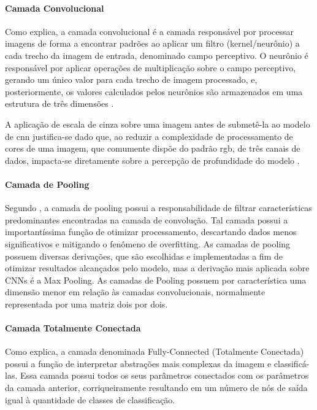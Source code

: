 \paragraph{Camada Convolucional}
Como  explica, 
a camada convolucional é a camada responsável por processar imagens de forma 
a encontrar padrões ao aplicar um filtro (kernel/neurônio) a cada trecho 
da imagem de entrada, denominado campo perceptivo. 
O neurônio é responsável por aplicar operações de multiplicação sobre o campo perceptivo, 
gerando um único valor para cada trecho de imagem processado, 
e, posteriormente, os valores calculados pelos neurônios são 
armazenados em uma estrutura de três dimensões \cite{ayeni2022convolutional}.

A aplicação de escala de cinza sobre uma imagem antes de 
submetê-la ao modelo de \gls{cnn} justifica-se dado que, 
ao reduzir a complexidade de processamento de cores de uma imagem, 
que comumente dispõe do padrão \gls{rgb}, de três canais de dados, 
impacta-se diretamente sobre a percepção de profundidade do modelo \cite{ayeni2022convolutional}. 

\paragraph{Camada de Pooling}
Segundo , 
a camada de pooling possui a responsabilidade de filtrar características predominantes 
encontradas na camada de convolução. 
Tal camada possui a importantíssima função de otimizar processamento, 
descartando dados menos significativos 
e mitigando o fenômeno de overfitting.
As camadas de pooling possuem diversas derivações, que são 
escolhidas e implementadas a fim de otimizar resultados alcançados pelo modelo, 
mas a derivação mais aplicada sobre CNNs é a Max Pooling.
As camadas de Pooling possuem por característica uma dimensão 
menor em relação às camadas convolucionais, 
normalmente representada por uma matriz dois por dois.

\paragraph{Camada Totalmente Conectada}
Como  explica, 
a camada denominada Fully-Connected (Totalmente Conectada) possui a função de interpretar 
abstrações mais complexas da imagem e classificá-las. 
Essa camada possui todos os seus parâmetros conectados 
com os parâmetros da camada anterior, 
corriqueiramente resultando em um número de nós de saída 
igual à quantidade de classes de classificação.

